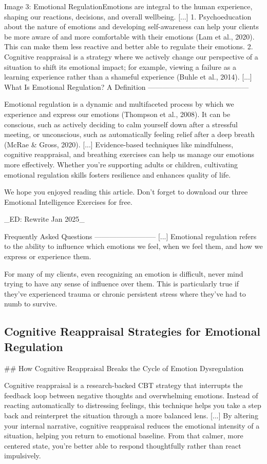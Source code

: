 \documentclass[12pt]{article}
\begin{document}
Image 3: Emotional RegulationEmotions are integral to the human experience, shaping our reactions, decisions, and overall wellbeing. [...] 1.   Psychoeducation about the nature of emotions and developing self-awareness can help your clients be more aware of and more comfortable with their emotions (Lam et al., 2020). This can make them less reactive and better able to regulate their emotions.
2.   Cognitive reappraisal is a strategy where we actively change our perspective of a situation to shift its emotional impact; for example, viewing a failure as a learning experience rather than a shameful experience (Buhle et al., 2014). [...] What Is Emotional Regulation? A Definition
------------------------------------------

Emotional regulation is a dynamic and multifaceted process by which we experience and express our emotions (Thompson et al., 2008). It can be conscious, such as actively deciding to calm yourself down after a stressful meeting, or unconscious, such as automatically feeling relief after a deep breath (McRae \& Gross, 2020). [...] Evidence-based techniques like mindfulness, cognitive reappraisal, and breathing exercises can help us manage our emotions more effectively. Whether you’re supporting adults or children, cultivating emotional regulation skills fosters resilience and enhances quality of life.

We hope you enjoyed reading this article. Don’t forget to download our three Emotional Intelligence Exercises for free.

\_ED: Rewrite Jan 2025\_

Frequently Asked Questions
-------------------------- [...] Emotional regulation refers to the ability to influence which emotions we feel, when we feel them, and how we express or experience them.

For many of my clients, even recognizing an emotion is difficult, never mind trying to have any sense of influence over them. This is particularly true if they’ve experienced trauma or chronic persistent stress where they’ve had to numb to survive.\subsection{Cognitive Reappraisal Strategies for Emotional Regulation}
\#\# How Cognitive Reappraisal Breaks the Cycle of Emotion Dysregulation

Cognitive reappraisal is a research-backed CBT strategy that interrupts the feedback loop between negative thoughts and overwhelming emotions. Instead of reacting automatically to distressing feelings, this technique helps you take a step back and reinterpret the situation through a more balanced lens. [...] By altering your internal narrative, cognitive reappraisal reduces the emotional intensity of a situation, helping you return to emotional baseline. From that calmer, more centered state, you’re better able to respond thoughtfully rather than react impulsively.
\end{document}
